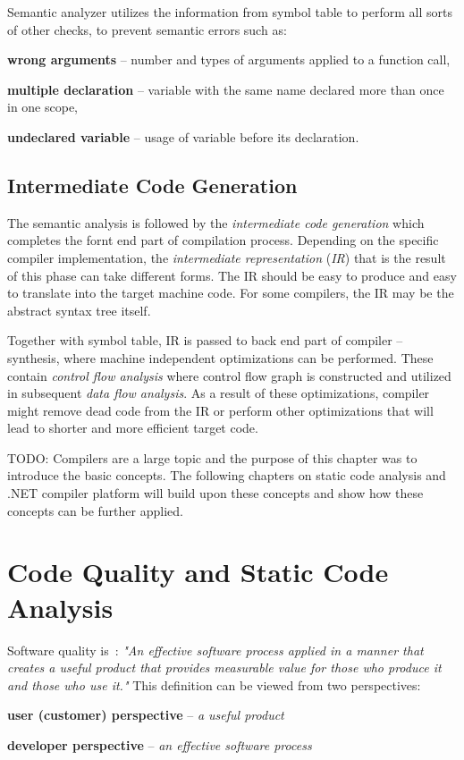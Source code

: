 \documentclass[
  digital, %
  table,   %
  lof,     %
  lot,     %
  oneside,
]{fithesis3}
\begin{document}
Semantic analyzer utilizes the information from symbol table to perform all sorts of other checks, to prevent semantic errors such as:
\begin{compactitem}
  \item \textbf{wrong arguments} -- number and types of arguments applied to a function call,
  \item \textbf{multiple declaration} -- variable with the same name declared more than once in one scope,
  \item \textbf{undeclared variable} -- usage of variable before its declaration.
\end{compactitem}
    
  \section{Intermediate Code Generation}
The semantic analysis is followed by the \textit{intermediate code generation} which completes the fornt end part of compilation process. Depending on the specific compiler implementation, the \textit{intermediate representation} (\textit{IR}) that is the result of this phase can take different forms. The IR should be easy to produce and easy to translate into the target machine code. For some compilers, the IR may be the abstract syntax tree itself.

\bigskip
Together with symbol table, IR is passed to back end part of compiler -- synthesis, where machine independent optimizations can be performed. These contain \textit{control flow analysis} where control flow graph is constructed and utilized in subsequent \textit{data flow analysis}. As a result of these optimizations, compiler might remove dead code from the IR or perform other optimizations that will lead to shorter and more efficient target code.

\bigskip
TODO:
Compilers are a large topic and the purpose of this chapter was to introduce the basic concepts. The following chapters on static code analysis and .NET compiler platform will build upon these concepts and show how these concepts can be further applied.


  \newpage
\chapter{Code Quality and Static Code Analysis}
Software quality is~\cite{software-engineering-practicioners-approach}: \textit{"An effective software process applied in a manner that creates a useful product that provides measurable value for those who produce it and those who use it."} This definition can be viewed from two perspectives:
\begin{compactitem}
  \item \textbf{user (customer) perspective} -- \textit{a useful product}
  \item \textbf{developer perspective} -- \textit{an effective software process}
\end{compactitem}
\end{document}

